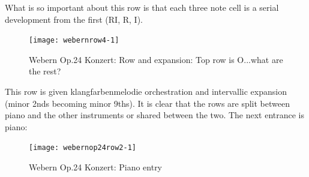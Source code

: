 What is so important about this row is that each three note cell is a serial development from the first (RI, R, I).

\begin{figure}[H]
\centering
\texttt{[image: webernrow4-1]}\caption{Webern Op.24 Konzert: Row and expansion: Top row is O...what are the rest?}
\label{fig:op24row2}
\end{figure}

This row is given klangfarbenmelodie orchestration and intervallic expansion (minor 2nds becoming minor 9ths). It is clear that the rows are split between piano and the other instruments or shared between the two. The next entrance is piano:

\begin{figure}[H]
\centering
\texttt{[image: webernop24row2-1]}\caption{Webern Op.24 Konzert: Piano entry}
\label{fig:op24row}
\end{figure}



